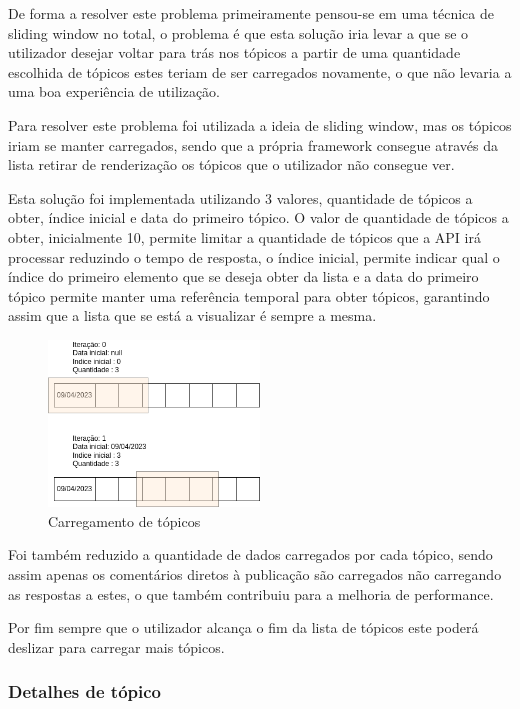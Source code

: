De forma a resolver este problema primeiramente pensou-se em uma técnica de sliding window no total, o problema é que esta solução iria levar a que se o utilizador desejar voltar para trás nos tópicos a partir de uma quantidade escolhida de tópicos estes teriam de ser carregados novamente, o que não levaria a uma boa experiência de utilização.

Para resolver este problema foi utilizada a ideia de sliding window, mas os tópicos iriam se manter carregados, sendo que a própria framework consegue através da lista retirar de renderização os tópicos que o utilizador não consegue ver. 

Esta solução foi implementada utilizando 3 valores, quantidade de tópicos a obter, índice inicial e data do primeiro tópico. O valor de quantidade de tópicos a obter, inicialmente 10, permite limitar a quantidade de tópicos que a API irá processar reduzindo o tempo de resposta, o índice inicial, permite indicar qual o índice do primeiro elemento que se deseja obter da lista e a data do primeiro tópico permite manter uma referência temporal para obter tópicos, garantindo assim que a lista que se está a visualizar é sempre a mesma.

\begin{figure}[htb]
  \centering
  \includegraphics[width=0.5\textwidth]{images/implementacao/frontend/forum/loading_topics/topics_loading.png}
  \caption{Carregamento de tópicos}
  \label{fig:74}
\end{figure}

Foi também reduzido a quantidade de dados carregados por cada tópico, sendo assim apenas os comentários diretos à publicação são carregados não carregando as respostas a estes, o que também contribuiu para a melhoria de performance.

Por fim sempre que o utilizador alcança o fim da lista de tópicos este poderá deslizar para carregar mais tópicos.

\newpage

\subsubsection{Detalhes de tópico}

